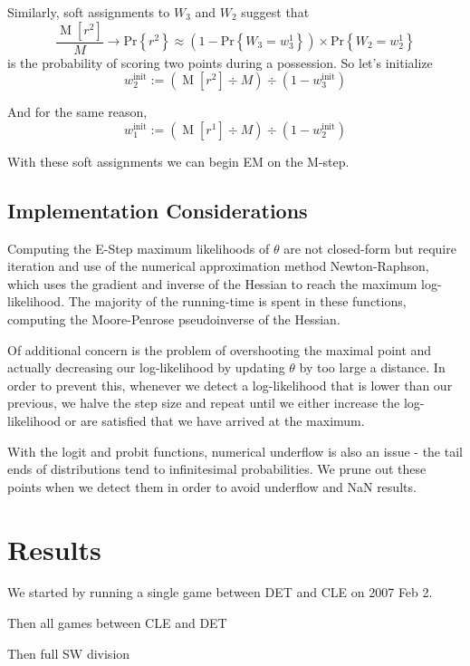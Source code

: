 \documentclass[10pt,twocolumn]{article}
\newcommand{\prb}[1]{\ensuremath{  \mathrm{Pr}\left\{ #1 \right\}  }}
\begin{document}
Similarly, soft assignments to $W_3$ and $W_2$ suggest that
\[
\frac{ \operatorname{M}\left[ r^2 \right] }{ M } \to \prb{r^2} \approx \left(1 - \prb{W_3 = w_3^1}\right) \times \prb{W_2 = w_2^1}
\]%
is the probability of scoring two points during a possession. So let's initialize
\[
w_2^{\mathrm{init}} := \left( \operatorname{M}\left[ r^2 \right] \div  M \right) \div \left( 1 - w_3^{\mathrm{init}} \right) 
\]%

And for the same reason,
\[
w_1^{\mathrm{init}} := \left( \operatorname{M}\left[ r^1 \right] \div  M \right) \div \left( 1 - w_2^{\mathrm{init}} \right) 
\]%

With these soft assignments we can begin EM on the M-step.


\subsection{Implementation Considerations}

Computing the E-Step maximum likelihoods of $\theta$ are not closed-form but require iteration and use of the numerical approximation method Newton-Raphson, which uses the gradient and inverse of the Hessian to reach the maximum log-likelihood. The majority of the running-time is spent in these functions, computing the Moore-Penrose pseudoinverse of the Hessian.

Of additional concern is the problem of overshooting the maximal point and actually decreasing our log-likelihood by updating $\theta$ by too large a distance. In order to prevent this, whenever we detect a log-likelihood that is lower than our previous, we halve the step size and repeat until we either increase the log-likelihood or are satisfied that we have arrived at the maximum.

With the logit and probit functions, numerical underflow is also an issue - the tail ends of distributions tend to infinitesimal probabilities. We prune out these points when we detect them in order to avoid underflow and NaN results.

\section{Results}

We started by running a single game between DET and CLE on 2007 Feb 2.

Then all games between CLE and DET

Then full SW division
\end{document}
